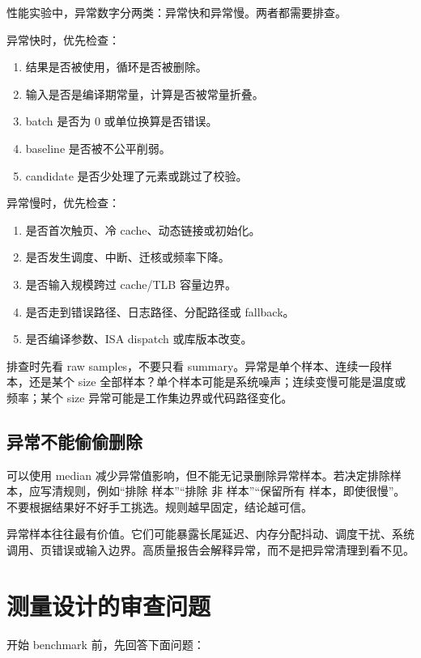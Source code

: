 性能实验中，异常数字分两类：异常快和异常慢。两者都需要排查。

异常快时，优先检查：

\begin{enumerate}
  \item 结果是否被使用，循环是否被删除。
  \item 输入是否是编译期常量，计算是否被常量折叠。
  \item batch 是否为 0 或单位换算是否错误。
  \item baseline 是否被不公平削弱。
  \item candidate 是否少处理了元素或跳过了校验。
\end{enumerate}

异常慢时，优先检查：

\begin{enumerate}
  \item 是否首次触页、冷 cache、动态链接或初始化。
  \item 是否发生调度、中断、迁核或频率下降。
  \item 是否输入规模跨过 cache/TLB 容量边界。
  \item 是否走到错误路径、日志路径、分配路径或 fallback。
  \item 是否编译参数、ISA dispatch 或库版本改变。
\end{enumerate}

排查时先看 raw samples，不要只看 summary。异常是单个样本、连续一段样本，还是某个 size 全部样本？单个样本可能是系统噪声；连续变慢可能是温度或频率；某个 size 异常可能是工作集边界或代码路径变化。

\subsection{异常不能偷偷删除}

可以使用 median 减少异常值影响，但不能无记录删除异常样本。若决定排除样本，应写清规则，例如“排除  样本”“排除  非  样本”“保留所有  样本，即使很慢”。不要根据结果好不好手工挑选。规则越早固定，结论越可信。

异常样本往往最有价值。它们可能暴露长尾延迟、内存分配抖动、调度干扰、系统调用、页错误或输入边界。高质量报告会解释异常，而不是把异常清理到看不见。

\section{测量设计的审查问题}

开始 benchmark 前，先回答下面问题：

